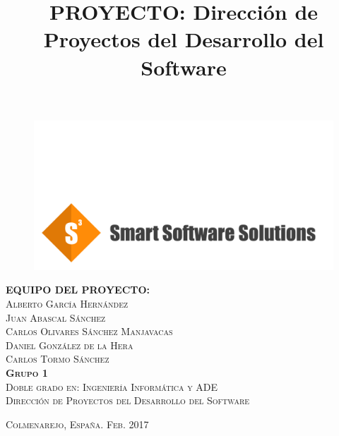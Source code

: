 \title{PROYECTO: Dirección de Proyectos del Desarrollo del Software} %

\begin{titlingpage}
\begin{center}

\begin{figure}[h]

\begin{center}
\includegraphics[width=1\textwidth]{./img/s3long.png}
\end{center}
\end{figure}

\vfill

\textsc{\LARGE \textbf{EQUIPO DEL PROYECTO:}}\\[2em]
\textsc{\Large Alberto García Hernández}\\[1em]
\textsc{\Large Juan Abascal Sánchez}\\[1em]
\textsc{\Large Carlos Olivares Sánchez Manjavacas}\\[1em]
\textsc{\Large Daniel González de la Hera}\\[1em]
\textsc{\Large Carlos Tormo Sánchez}\\[10em]

\textsc{\large \textbf{Grupo 1}}\\[1em]

\textsc{Doble grado en: Ingeniería Informática y ADE}\\[1em]

\textsc{Dirección de Proyectos del Desarrollo del Software}\\[6em]


\end{center}

\textsc{Colmenarejo, España. \hspace*{\fill} Feb. 2017}


\end{titlingpage}
